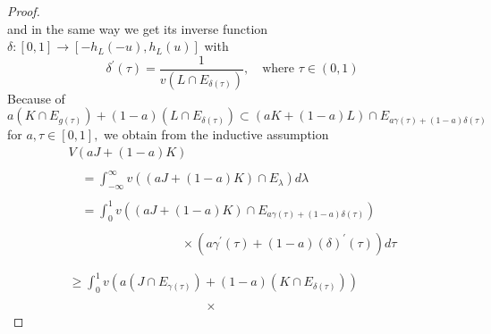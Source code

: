 \documentclass[oneside]{book}
\begin{document}
\begin{proof}
\[\]
and in the same way
we get its inverse function $ \delta:[0,1] \rightarrow\left[-h_{L}(-u), h_{L}(u)\right]$     with 
\[
\delta^{\prime}(\tau)=\frac{1}{v\left(L \cap E_{\delta(\tau)}\right)}, \quad  \text{where } \tau \in(0,1)
\]
Because of
\[
a\left(K \cap E_{g(\tau)}\right)+(1-a)\left(L \cap E_{\delta(\tau)}\right) \subset(a K+(1-a) L) \cap E_{a \gamma(\tau)+(1-a) \delta(\tau)}
\]
for $a, \tau \in[0,1],$ we obtain from the inductive assumption
\[
\begin{array}{l}
V(a J+(1-a) K) \\\\
\quad=\int_{-\infty}^{\infty} v\left((a J+(1-a) K) \cap E_{\lambda}\right) d \lambda \\\\
\quad=\int_{0}^{1} v\left((a J+(1-a) K) \cap E_{a \gamma(\tau)+(1-a) \delta(\tau)}\right) \\\\
 \quad  \quad \quad \quad \quad \quad \quad \quad \quad \times
\left(a \gamma^{\prime}(\tau)+(1-a) (\delta)^{\prime}(\tau)\right) d \tau
\\\\\\
\geq \int_{0}^{1} v\left(a\left(J \cap E_{\gamma(\tau)}\right)+(1-a)\left(K \cap E_{\delta(\tau)}\right)\right)
\\\\
 \quad \quad \quad \quad \quad \quad \quad \quad \quad \quad \quad
 
 \times
 

\end{array}\]
\end{proof}
\end{document}
